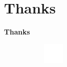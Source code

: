 
\section{Thanks}
\begin{frame}
    
    \centering
    \vspace{2cm}
    
    \textbf{\Huge Thanks}
    
    
    
    
    \vspace{2cm}
    \begin{figure}
        \centering
        \begin{subfigure}{0.2\textwidth}
            \centering
            \includegraphics[height=1cm]{assets/logo/white-outline.pdf}
        \end{subfigure}%
    \end{figure}
\end{frame}